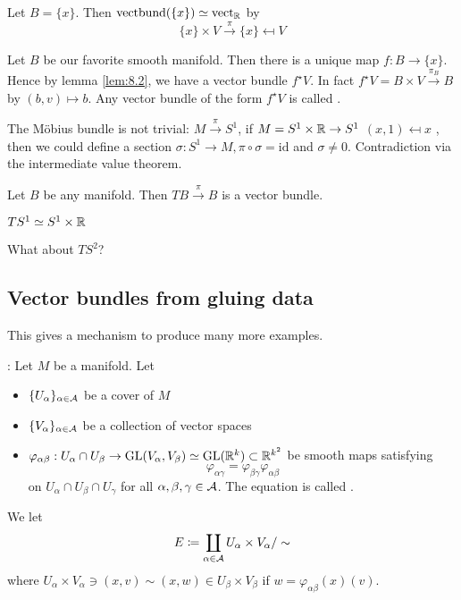 \begin{example}
    Let \(B=\{x\}\). Then \(\text{vectbund}(\{x\})\simeq \text{vect}_{\mathbb{R}}\) by 
    \[\{x\}\times V \stackrel{\pi}{\to} \{x\}\mapsfrom V\]
\end{example}

\begin{example}
    Let \(B\) be our favorite smooth manifold. Then there is a unique map \(f:B\to \{x\}\).
    Hence by lemma \ref{lem:8.2}, we have a vector bundle \(f^\star V\). In fact 
    \(f^\star V= B\times V\stackrel{\pi_B}{\to} B\) by \((b,v)\mapsto b\).
    Any vector bundle of the form \(f^\star V\) is called . 
\end{example}

\begin{remark}
    The Möbius bundle is not trivial:
    \(M\stackrel{\pi}{\to} S^1\), if \(M=S^1 \times \mathbb{R}\to S^1\)  \((x,1)\mapsfrom x\)
    , then we could define a section \(\sigma:S^1\to M,\pi\circ \sigma=\text{id}\) and \(\sigma\neq 0\).
    Contradiction via the intermediate value theorem.
\end{remark}

\begin{example}
    Let \(B\) be any manifold. Then \(TB\stackrel{\pi}{\to} B\) is a vector bundle.
\end{example}

 \(T S^1\simeq S^1\times \mathbb{R}\) 

What about \(TS^2\)?

\subsection{Vector bundles from gluing data}

This gives a mechanism to produce many more examples.

: %
Let \(M\) be a manifold. Let 
\begin{itemize}
    \item \(\{U_\alpha\}_{\alpha\in \mathcal{A}}\) be a cover of \(M\)
    \item \(\{V_\alpha\}_{\alpha\in \mathcal{A}}\) be a collection of vector spaces 
    \item \(\varphi_{\alpha\beta}:U_\alpha\cap U_\beta\to \text{GL}(V_\alpha,V_\beta)\simeq \text{GL}(\mathbb{R}^k)\subset \mathbb{R}^{k^2}\) be 
          smooth maps satisfying \[\varphi_{\alpha\gamma}=\varphi_{\beta\gamma}\varphi_{\alpha\beta}\] on  \(U_\alpha\cap U_\beta\cap U_\gamma\) for all \(\alpha,\beta,\gamma\in\mathcal{A}\). 
          The equation is called .
\end{itemize}
We let \begin{equation}
    E\coloneqq \coprod_{\alpha\in\mathcal{A}} U_\alpha \times V_\alpha /\sim     
\end{equation}
where \(U_{\alpha}\times V_\alpha \ni (x,v)\sim (x,w)\in U_\beta\times V_\beta\)
if \(w=\varphi_{\alpha\beta}(x)(v)\).

